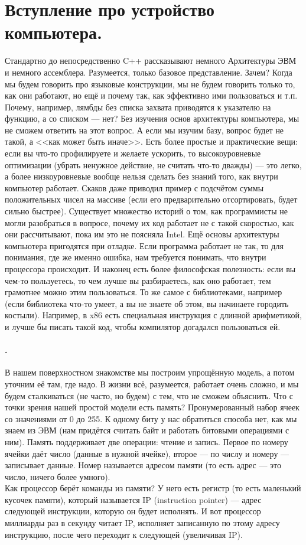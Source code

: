 \documentclass{article}
\begin{document}
    \section{Вступление про устройство компьютера.}
    Стандартно до непосредственно C++ рассказывают немного Архитектуры ЭВМ и немного ассемблера. Разумеется, только базовое представление. Зачем? Когда мы будем говорить про языковые конструкции, мы не будем говорить только то, как они работают, но ещё и почему так, как эффективно ими пользоваться и т.п.  Почему, например, лямбды без списка захвата приводятся к указателю на функцию, а со списком --- нет? Без изучения основ архитектуры компьютера, мы не сможем ответить на этот вопрос. А если мы изучим базу, вопрос будет не такой, а <<как может быть иначе>>. Есть более простые и практические вещи: если вы что-то профилируете и желаете ускорить, то высокоуровневые оптимизации (убрать ненужное действие, не считать что-то дважды) --- это легко, а более низкоуровневые вообще нельзя сделать без знаний того, как внутри компьютер работает. Скаков даже приводил пример с подсчётом суммы положительных чисел на массиве (если его предварительно отсортировать, будет сильно быстрее). Существует множество историй о том, как программисты не могли разобраться в вопросе, почему их код работает не с такой скоростью, как они рассчитывают, пока им это не поясняла Intel. Ещё основы архитектуры компьютера пригодятся при отладке. Если программа работает не так, то для понимания, где же именно ошибка, нам требуется понимать, что внутри процессора происходит. И наконец есть более философская полезность: если вы чем-то пользуетесь, то чем лучше вы разбираетесь, как оно работает, тем грамотнее можно этим пользоваться. То же самое с библиотеками, например (если библиотека что-то умеет, а вы не знаете об этом, вы начинаете городить костыли). Например, в x86 есть специальная инструкция с длинной арифметикой, и лучше бы писать такой код, чтобы компилятор догадался пользоваться ей.
    \paragraph{.}
    В нашем поверхностном знакомстве мы построим упрощённую модель, а потом уточним её там, где надо. В жизни всё, разумеется, работает очень сложно, и мы будем сталкиваться (не часто, но будем) с тем, что не сможем объяснить. Что с точки зрения нашей простой модели есть память? Пронумерованный набор ячеек со значениями от 0 до 255. К одному биту у нас обратиться способа нет, как мы знаем из ЭВМ (нам придётся считать байт и работать битовыми операциями с ним). Память поддерживает две операции: чтение и запись. Первое по номеру ячейки даёт число (данные в нужной ячейке), второе --- по числу и номеру --- записывает данные. Номер называется адресом памяти (то есть адрес --- это число, ничего более умного).\\
    Как процессор берёт команды из памяти? У него есть регистр (то есть маленький кусочек памяти), который называется IP (instruction pointer) --- адрес следующей инструкции, которую он будет исполнять. И вот процессор миллиарды раз в секунду читает IP, исполняет записанную по этому адресу инструкцию, после чего переходит к следующей (увеличивая IP).
\end{document}
